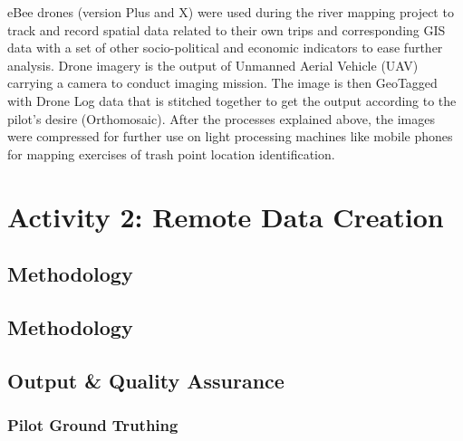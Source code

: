 \documentclass[a4paper,12pt,twoside]{article}
\begin{document}
    \begin{multicols}{2}
    eBee drones (version Plus and X) were used during the river mapping project to track and record spatial data related to their own trips and corresponding GIS data with a set of other socio-political and economic indicators to ease further analysis. Drone imagery is the output of Unmanned Aerial Vehicle (UAV) carrying a camera to conduct imaging mission. The image is then GeoTagged with Drone Log data that is stitched together to get the output according to the pilot’s desire (Orthomosaic). After the processes explained above, the images were compressed for further use on light processing machines like mobile phones for mapping exercises of trash point location identification.
    \end{multicols}
    
\section{Activity 2: Remote Data Creation}

\subsection{Methodology}

    \lipsum[0-2]

\subsection{Methodology}

    \begin{multicols}{2}
    \lipsum[0-5]
    \end{multicols}

\subsection{Output & Quality Assurance}

    \begin{multicols}{2}
    \lipsum[0-5]
    \end{multicols}
    
\subsubsection{Pilot Ground Truthing}

    \begin{multicols}{2}
    \lipsum[0-2]
    \end{multicols}
    
\end{document}
